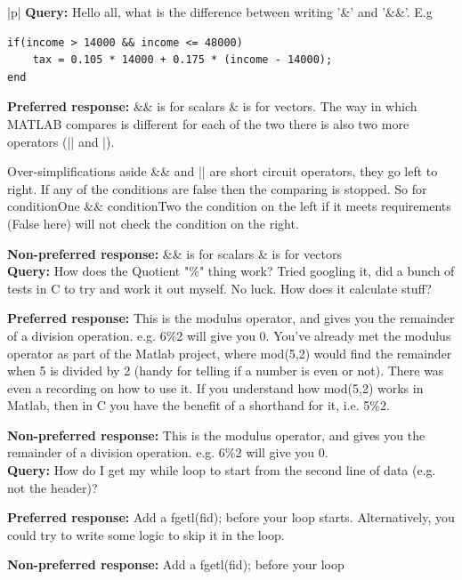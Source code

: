 
\renewcommand{\arraystretch}{1.1}

\begin{table}[H]
\centering
\caption{Some examples of preference pairs in our dataset}
\label{tab:rl_pairs}
\begin{tabular}{|p{\linewidth}|}
\hline
\textbf{Query:} Hello all, what is the difference between writing '\&' and '\&\&'. E.g 
\begin{lstlisting}
if(income > 14000 && income <= 48000)
    tax = 0.105 * 14000 + 0.175 * (income - 14000);
end
\end{lstlisting}

\textbf{Preferred response:}
\&\& is for scalars \& is for vectors.
The way in which MATLAB compares is different for each of the two there is also two more operators (|| and |).

Over-simplifications aside \&\& and || are short circuit operators, they go left to right. If any of the conditions are false then the comparing is stopped. So for conditionOne \&\& conditionTwo the condition on the left if it meets requirements (False here) will not check the condition on the right.

\textbf{Non-preferred response:} \&\& is for scalars \& is for vectors \\
\hline
\textbf{Query:} How does the Quotient "\%" thing work?
Tried googling it, did a bunch of tests in C to try and work it out myself. No luck. How does it calculate stuff?

\textbf{Preferred response:}
This is the modulus operator, and gives you the remainder of a division operation. e.g. 6\%2 will give you 0.
You've already met the modulus operator as part of the Matlab project, where mod(5,2) would find the remainder when 5 is divided by 2 (handy for telling if a number is even or not). There was even a recording on how to use it.
If you understand how mod(5,2) works in Matlab, then in C you have the benefit of a shorthand for it, i.e. 5\%2.

\textbf{Non-preferred response:} This is the modulus operator, and gives you the remainder of a division operation. e.g. 6\%2 will give you 0. \\
\hline
\textbf{Query:} How do I get my while loop to start from the second line of data (e.g. not the header)?

\textbf{Preferred response:}
Add a fgetl(fid); before your loop starts. Alternatively, you could try to write some logic to skip it in the loop.

\textbf{Non-preferred response:} Add a fgetl(fid); before your loop \\
\hline
\end{tabular}
\end{table}
